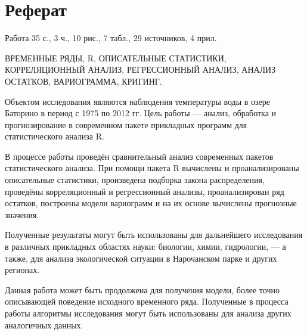 \newpage

\chapter*{Реферат}
Работа 35 с., 3 ч., 10 рис., 7 табл., 29 источников, 4 прил.

ВРЕМЕННЫЕ РЯДЫ, R, ОПИСАТЕЛЬНЫЕ СТАТИСТИКИ, КОРРЕЛЯЦИОННЫЙ АНАЛИЗ, РЕГРЕССИОННЫЙ АНАЛИЗ, АНАЛИЗ ОСТАТКОВ, ВАРИОГРАММА, КРИГИНГ.

Объектом исследования являются наблюдения температуры воды в озере Баторино в период с 1975 по 2012 гг.
Цель работы --- анализ, обработка и прогнозирование в современном пакете прикладных программ для статистического анализа R.

В процессе работы проведён сравнительный анализ современных пакетов статистического анализа. При помощи пакета R вычислены и проанализированы описательные статистики, произведена подборка закона распределения, проведёны корреляционный и регрессионный анализы, проанализирован ряд остатков, построены модели вариограмм и на их основе вычислены прогнозные значения.

Полученные результаты могут быть использованы для дальнейшего исследования в различных прикладных областях науки: биологии, химии, гидрологии, --- а также, для анализа экологической ситуации в Нарочанском парке и других регионах.

Данная работа может быть продолжена для получения модели, более точно описывающей поведение исходного временного ряда. Полученные в процесса работы алгоритмы исследования могут быть использованы для анализа других аналогичных данных.